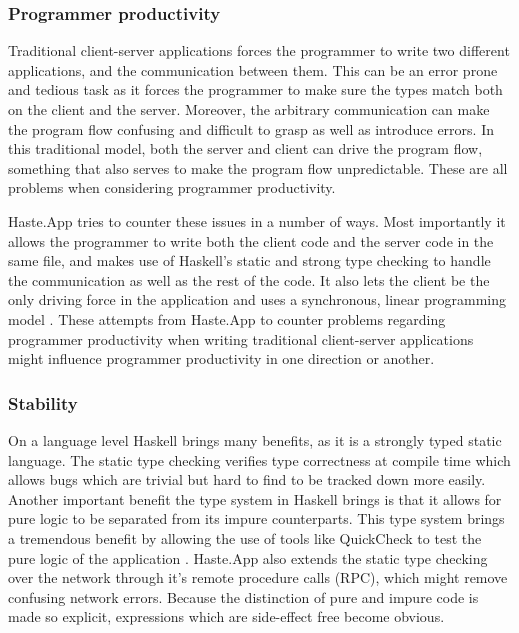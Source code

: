 \documentclass[a4paper]{article}
\begin{document}
\subsubsection{Programmer productivity}
\label{sec:programmer_productivity}
Traditional client-server applications forces the programmer to write two different applications, and the communication between them. This can be an error prone and tedious task as it forces the programmer to make sure the types match both on the client and the server. Moreover, the arbitrary communication can make the program flow confusing and difficult to grasp as well as introduce errors. In this traditional model, both the server and client can drive the program flow, something that also serves to make the program flow unpredictable. These are all problems when considering programmer productivity. 

Haste.App tries to counter these issues in a number of ways. Most importantly it allows the programmer to write both the client code and the server code in the same file, and makes use of Haskell's static and strong type checking to handle the communication as well as the rest of the code. It also lets the client be the only driving force in the application and uses a synchronous, linear programming model \cite{ekblad2015seamless}. These attempts from Haste.App to counter problems regarding programmer productivity when writing traditional client-server applications might influence programmer productivity in one direction or another. 


\subsubsection{Stability}
On a language level Haskell brings many benefits, as it is a strongly typed static language. The static type checking verifies type correctness at compile time which allows bugs which are trivial but hard to find to be tracked down more easily. Another important benefit the type system in Haskell brings is that it allows for pure logic to be separated from its impure counterparts. This type system brings a tremendous benefit by allowing the use of tools like QuickCheck to test the pure logic of the application \cite{Claessen:2011:QLT:1988042.1988046}. Haste.App also extends the static type checking over the network through it's remote procedure calls (RPC), which might remove confusing network errors. Because the distinction of pure and impure code is made so explicit, expressions which are side-effect free become obvious.
\end{document}
